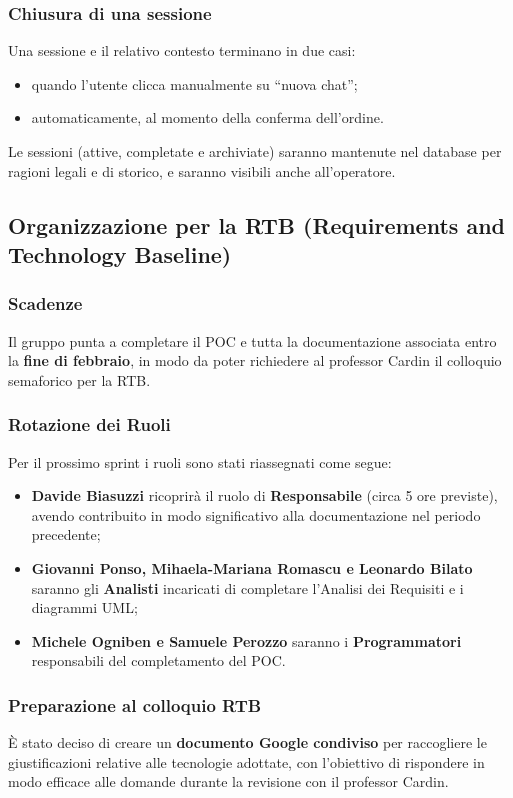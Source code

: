 \documentclass[a4paper, 11pt, oneside]{scrartcl}
\begin{document}
\subsubsection{Chiusura di una sessione}
Una sessione e il relativo contesto terminano in due casi:
\begin{itemize}
    \item quando l'utente clicca manualmente su ``nuova chat'';
    \item automaticamente, al momento della conferma dell'ordine.
\end{itemize}
Le sessioni (attive, completate e archiviate) saranno mantenute nel database per ragioni legali e di storico, e saranno visibili anche all'operatore.

\subsection{Organizzazione per la RTB (Requirements and Technology Baseline)}

\subsubsection{Scadenze}
Il gruppo punta a completare il POC e tutta la documentazione associata entro la \textbf{fine di febbraio}, in modo da poter richiedere al professor Cardin il colloquio semaforico per la RTB.

\subsubsection{Rotazione dei Ruoli}
Per il prossimo sprint i ruoli sono stati riassegnati come segue:
\begin{itemize}
    \item \textbf{Davide Biasuzzi} ricoprirà il ruolo di \textbf{Responsabile} (circa 5 ore previste), avendo contribuito in modo significativo alla documentazione nel periodo precedente;
    \item \textbf{Giovanni Ponso, Mihaela-Mariana Romascu e Leonardo Bilato} saranno gli \textbf{Analisti} incaricati di completare l'Analisi dei Requisiti e i diagrammi UML;
    \item \textbf{Michele Ogniben e Samuele Perozzo} saranno i \textbf{Programmatori} responsabili del completamento del POC.
\end{itemize}

\subsubsection{Preparazione al colloquio RTB}
È stato deciso di creare un \textbf{documento Google condiviso} per raccogliere le giustificazioni relative alle tecnologie adottate, con l'obiettivo di rispondere in modo efficace alle domande durante la revisione con il professor Cardin.
\end{document}
